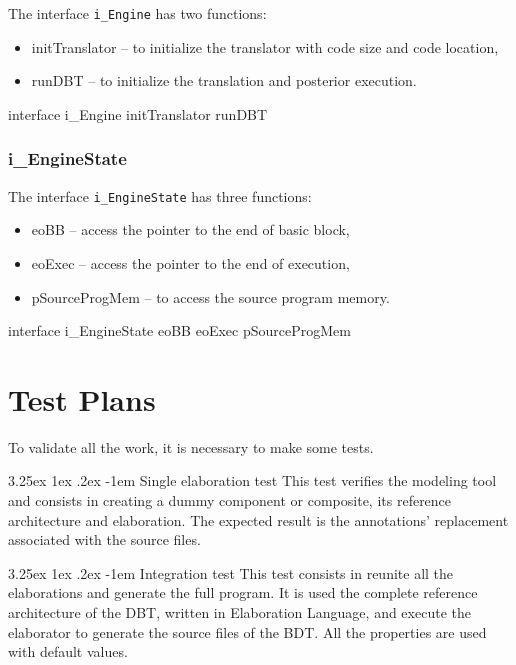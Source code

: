 \documentclass[11pt]{report}
\makeatletter
\renewcommand\paragraph{\@startsection{paragraph}{5}{\z@}%
	{3.25ex \@plus1ex \@minus.2ex}%
	{-1em}%
	{\normalfont\normalsize\bfseries}}
\makeatother
\begin{document}
			\par The interface \texttt{i\_Engine} has two functions:
			\begin{itemize}
				\item initTranslator -- to initialize the translator with code size and code location,
				\item runDBT -- to initialize the translation and posterior execution.
			\end{itemize}
			
			\begin{EL}
			interface i_Engine{
				initTranslator
				runDBT
			}
			\end{EL}
			
			\subsubsection*{i\_EngineState}		
			
			\par The interface \texttt{i\_EngineState} has three functions:
			\begin{itemize}
				\item eoBB -- access the pointer to the end of basic block,
				\item eoExec -- access the pointer to the end of execution,
				\item pSourceProgMem -- to access the source program memory.
			\end{itemize}	
			
			\begin{EL}
			interface i_EngineState{
				eoBB
				eoExec
				pSourceProgMem
			}
			\end{EL}	

	\section{Test Plans}
	
	\par To validate all the work, it is necessary to make some tests. 
	
	\paragraph{Single elaboration test} This test verifies the modeling tool and consists in creating a dummy component or composite, its reference architecture and elaboration. The expected result is the annotations' replacement associated with the source files.  
	
	\paragraph{Integration test} This test consists in reunite all the elaborations and generate the full program. It is used the complete reference architecture of the DBT, written in Elaboration Language, and execute the elaborator to generate the source files of the BDT. All the properties are used with default values.
		
\end{document}
